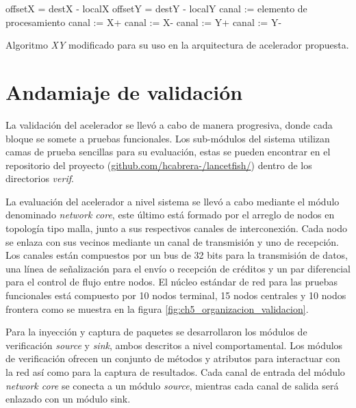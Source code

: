 \begin{algorithm}[]
		\Begin
			{
			offsetX = destX - localX\;
			offsetY = destY - localY\;
					{canal := elemento de procesamiento\;}
					{
							{canal := X+\;}
							{
									{canal := X-\;}
									{
											{canal := Y+\;}
											{canal := Y-\;}
									}
							}
					}			
		}
	\caption
		{
			Algoritmo \textit{XY} modificado para su uso en la arquitectura de acelerador propuesta.
		}	
	\label{code:xy_extended}
\end{algorithm}



\section{Andamiaje de validación}
	\label{ch5_andamieje_de_validacion}

La validación del acelerador se llevó a cabo de manera progresiva, donde cada bloque se somete a pruebas funcionales. Los sub-módulos del sistema utilizan camas de prueba sencillas para su evaluación, estas se pueden encontrar en el repositorio del proyecto (\url{github.com/hcabrera-/lancetfish/}) dentro de los directorios \textit{verif}.

La evaluación del acelerador a nivel sistema se llevó a cabo mediante el módulo denominado \textit{network core}, este último está formado por el arreglo de nodos en topología tipo malla, junto a sus respectivos canales de interconexión. Cada nodo se enlaza con sus vecinos mediante un canal de transmisión y uno de recepción. Los canales están compuestos por un bus de 32 bits para la transmisión de datos, una línea de señalización para el envío o recepción de créditos y un par diferencial para el control de flujo entre nodos. El núcleo estándar de red para las pruebas funcionales está compuesto por 10 nodos terminal, 15 nodos centrales y 10 nodos frontera como se muestra en la figura \ref{fig:ch5_organizacion_validacion}.

Para la inyección y captura de paquetes se desarrollaron los módulos de verificación \textit{source} y \textit{sink}, ambos descritos a nivel comportamental. Los módulos de verificación ofrecen un conjunto de métodos y atributos para interactuar con la red así como para la captura de resultados.
Cada canal de entrada del módulo \textit{network core} se conecta a un módulo \textit{source}, mientras cada canal de salida será enlazado con un módulo sink.

